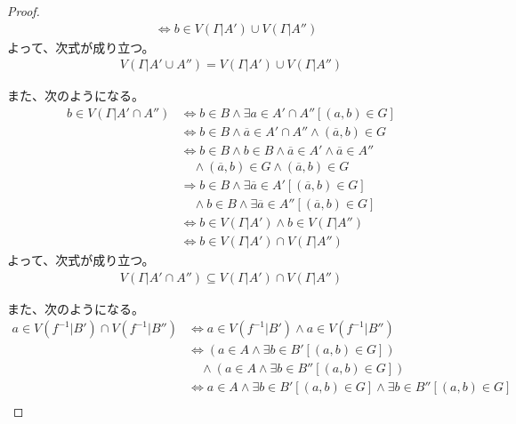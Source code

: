 \documentclass[a4paper]{jsarticle}
\begin{document}
\begin{proof}
\begin{align*}
&\Leftrightarrow b \in V\left( \varGamma|A' \right) \cup V\left( \varGamma|A'' \right)
\end{align*}
よって、次式が成り立つ。
\begin{align*}
V\left( \varGamma|A' \cup A'' \right) = V\left( \varGamma|A' \right) \cup V\left( \varGamma|A'' \right)
\end{align*}\par
また、次のようになる。
\begin{align*}
b \in V\left( \varGamma|A' \cap A'' \right) &\Leftrightarrow b \in B \land \exists a \in A' \cap A''\left[ (a,b) \in G \right]\\
&\Leftrightarrow b \in B \land \overline{a} \in A' \cap A'' \land \left( \overline{a},b \right) \in G\\
&\Leftrightarrow b \in B \land b \in B \land \overline{a} \in A' \land \overline{a} \in A'' \\
&\quad \land \left( \overline{a},b \right) \in G \land \left( \overline{a},b \right) \in G\\
&\Rightarrow b \in B \land \exists\overline{a} \in A'\left[ \left( \overline{a},b \right) \in G \right] \\
&\quad \land b \in B \land \exists\overline{a} \in A''\left[ \left( \overline{a},b \right) \in G \right]\\
&\Leftrightarrow b \in V\left( \varGamma|A' \right) \land b \in V\left( \varGamma|A'' \right) \\
&\Leftrightarrow b \in V\left( \varGamma|A' \right) \cap V\left( \varGamma|A'' \right)
\end{align*}
よって、次式が成り立つ。
\begin{align*}
V\left( \varGamma|A' \cap A'' \right) \subseteq V\left( \varGamma|A' \right) \cap V\left( \varGamma|A'' \right)
\end{align*}\par
また、次のようになる。
\begin{align*}
a \in V\left( f^{- 1}|B' \right) \cap V\left( f^{- 1}|B'' \right) &\Leftrightarrow a \in V\left( f^{- 1}|B' \right) \land a \in V\left( f^{- 1}|B'' \right)\\
&\Leftrightarrow \left( a \in A \land \exists b \in B'\left[ (a,b) \in G \right] \right) \\
&\quad \land \left( a \in A \land \exists b \in B''\left[ (a,b) \in G \right] \right)\\
&\Leftrightarrow a \in A \land \exists b \in B'\left[ (a,b) \in G \right] \land \exists b \in B''\left[ (a,b) \in G \right]\\

\end{align*}
\end{proof}
\end{document}
